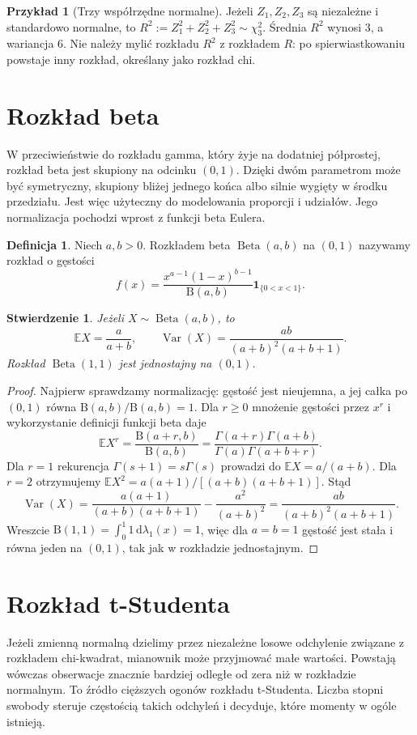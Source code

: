 \documentclass[11pt,a4paper,oneside]{report}
\numberwithin{equation}{chapter}
\theoremstyle{plain}
\newtheorem{stwierdzenie}[twierdzenie]{Stwierdzenie}
\theoremstyle{definition}
\newtheorem{definicja}{Definicja}[chapter]
\newtheorem{przyklad}{Przykład}[chapter]
\theoremstyle{remark}
\newcommand{\E}{\mathbb{E}}
\newcommand{\Var}{\operatorname{Var}}
\newcommand{\ind}[1]{\mathbf{1}_{#1}}
\newcommand{\dd}{\mathrm{d}}
\newcommand{\Betad}{\operatorname{Beta}}
\begin{document}
\begin{przyklad}[Trzy współrzędne normalne]
Jeżeli $Z_1,Z_2,Z_3$ są niezależne i standardowo normalne,
to $R^2:=Z_1^2+Z_2^2+Z_3^2\sim\chi^2_3$.
Średnia $R^2$ wynosi $3$, a wariancja $6$.
Nie należy mylić rozkładu $R^2$ z rozkładem $R$:
po spierwiastkowaniu powstaje inny rozkład, określany
jako rozkład chi.
\end{przyklad}

\section{Rozkład beta}
W przeciwieństwie do rozkładu gamma, który żyje na dodatniej
półprostej, rozkład beta jest skupiony na odcinku $(0,1)$.
Dzięki dwóm parametrom może być symetryczny, skupiony bliżej
jednego końca albo silnie wygięty w środku przedziału.
Jest więc użyteczny do modelowania proporcji i udziałów.
Jego normalizacja pochodzi wprost z funkcji beta Eulera.

\begin{definicja}
Niech $a,b>0$. Rozkładem beta $\Betad(a,b)$ na $(0,1)$
nazywamy rozkład o gęstości
\begin{equation}\label{eq:beta}
f(x)=\frac{x^{a-1}(1-x)^{b-1}}{\mathrm B(a,b)}
\ind{\{0<x<1\}}.
\end{equation}
\end{definicja}

\begin{stwierdzenie}
Jeżeli $X\sim\Betad(a,b)$, to
\[
\E X=\frac a{a+b},\qquad
\Var(X)=\frac{ab}{(a+b)^2(a+b+1)}.
\]
Rozkład $\Betad(1,1)$ jest jednostajny na $(0,1)$.
\end{stwierdzenie}
\begin{proof}
Najpierw sprawdzamy normalizację: gęstość jest
nieujemna, a jej całka po $(0,1)$ równa
$\mathrm B(a,b)/\mathrm B(a,b)=1$.
Dla $r\geq0$ mnożenie gęstości przez $x^r$
i wykorzystanie definicji funkcji beta daje
\[
\E X^r=\frac{\mathrm B(a+r,b)}{\mathrm B(a,b)}
=\frac{\Gamma(a+r)\Gamma(a+b)}
{\Gamma(a)\Gamma(a+b+r)}.
\]
Dla $r=1$ rekurencja $\Gamma(s+1)=s\Gamma(s)$
prowadzi do $\E X=a/(a+b)$. Dla $r=2$
otrzymujemy
$\E X^2=a(a+1)/[(a+b)(a+b+1)]$.
Stąd
\[
\Var(X)=\frac{a(a+1)}{(a+b)(a+b+1)}
-\frac{a^2}{(a+b)^2}
=\frac{ab}{(a+b)^2(a+b+1)}.
\]
Wreszcie $\mathrm B(1,1)=\int_0^1 1\,\dd\lambda_1(x)=1$,
więc dla $a=b=1$ gęstość jest stała i równa jeden
na $(0,1)$, tak jak w rozkładzie jednostajnym.
\end{proof}

\section{Rozkład t-Studenta}
Jeżeli zmienną normalną dzielimy przez niezależne losowe
odchylenie związane z rozkładem chi-kwadrat, mianownik może
przyjmować małe wartości. Powstają wówczas obserwacje znacznie
bardziej odległe od zera niż w rozkładzie normalnym. To źródło
cięższych ogonów rozkładu t-Studenta. Liczba stopni swobody
steruje częstością takich odchyleń i decyduje, które momenty
w ogóle istnieją.
\end{document}
